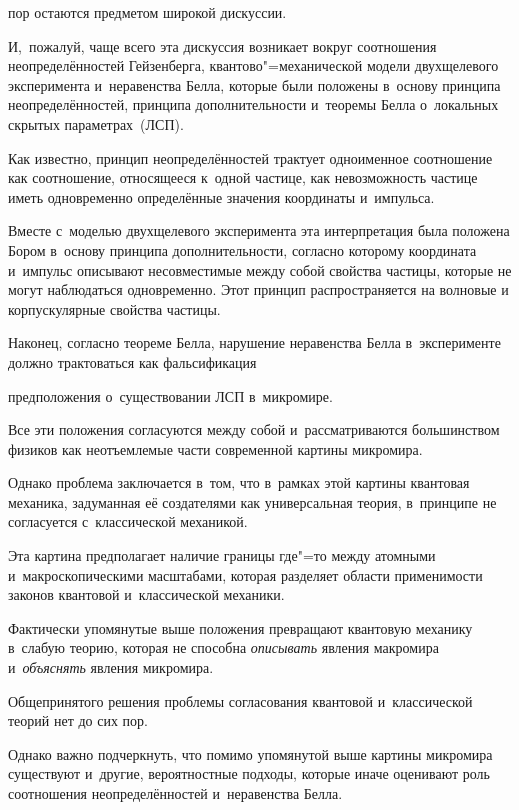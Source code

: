пор остаются предметом широкой дискуссии. 

И,~пожалуй, чаще всего эта дискуссия возникает вокруг соотношения неопределённостей Гейзенберга, квантово"=механической модели двухщелевого эксперимента и~неравенства Белла, которые были положены в~основу принципа неопределённостей, принципа дополнительности и~теоремы Белла о~локальных скрытых параметрах~(ЛСП).



Как известно, принцип неопределённостей трактует одноименное соотношение как соотношение, относящееся к~одной частице, как невозможность частице иметь одновременно определённые значения координаты и~импульса. 

Вместе с~моделью двухщелевого эксперимента эта интерпретация была положена Бором в~основу принципа дополнительности, согласно которому координата и~импульс описывают несовместимые между собой свойства частицы, которые не могут наблюдаться одновременно. Этот принцип распространяется на волновые и корпускулярные свойства частицы. 

Наконец, согласно теореме Белла, нарушение неравенства Белла в~эксперименте должно трактоваться как фальсификация

предположения о~существовании ЛСП в~микромире.



Все эти положения согласуются между собой и~рассматриваются большинством физиков как неотъемлемые части современной картины микромира. 

Однако проблема заключается в~том, что в~рамках этой картины квантовая механика, задуманная её создателями как универсальная теория, в~принципе не согласуется с~классической механикой. 

Эта картина предполагает наличие границы где"=то между атомными и~макроскопическими масштабами, которая разделяет области применимости законов квантовой и~классической механики. 

Фактически упомянутые выше положения превращают квантовую механику в~слабую теорию, которая не способна {\it описывать} явления макромира и~{\it объяснять} явления микромира.



Общепринятого решения проблемы согласования квантовой и~классической теорий нет до сих пор. 

Однако важно подчеркнуть, что помимо упомянутой выше картины микромира существуют и~другие, вероятностные подходы, которые иначе оценивают роль соотношения неопределённостей и~неравенства Белла. 


